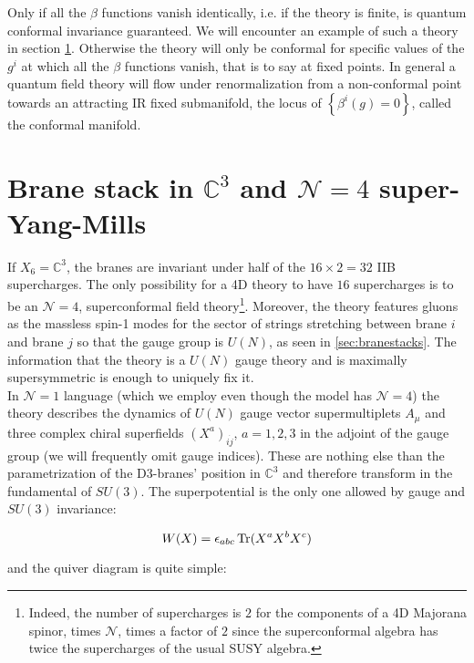 Only if all the $\beta$ functions vanish identically, i.e. if the theory is finite, is quantum conformal invariance guaranteed. We will encounter an example of such a theory in section \ref{SYM4}. Otherwise the theory will only be conformal for specific values of the $g^i$ at which all the $\beta$ functions vanish, that is to say at fixed points. In general a quantum field theory will flow under renormalization from a non-conformal point towards an attracting IR fixed submanifold, the locus of $\left\{ \beta^i(g) = 0 \right\}$, called the conformal manifold.


\section{Brane stack in $\mathbb{C}^3$ and $\mathcal{N}=4$ super-Yang-Mills} \label{SYM4}

If $X_6 = \mathbb{C}^3$, the branes are invariant under half of the $16 \times 2 = 32$ IIB supercharges. The only possibility for a 4D theory to have $16$ supercharges is to be an $\mathcal{N}=4$, superconformal field theory\footnote{Indeed, the number of supercharges is $2$ for the components of a 4D Majorana spinor, times $\mathcal{N}$, times a factor of $2$ since the superconformal algebra has twice the supercharges of the usual SUSY algebra.}. Moreover, the theory features gluons as the massless spin-1 modes for the sector of strings stretching between brane $i$ and brane $j$ so that the gauge group is $U(N)$, as seen in \ref{sec:branestacks}. The information that the theory is a $U(N)$ gauge theory and is maximally supersymmetric is enough to uniquely fix it.\\

In $\mathcal{N}=1$ language (which we employ even though the model has $\mathcal{N}=4$) the theory describes the dynamics of $U(N)$ gauge vector supermultiplets $A_\mu$ and three complex chiral superfields $(X^a)_{i\dot j}$, $a=1,2,3$ in the adjoint of the gauge group (we will frequently omit gauge indices). These are nothing else than the parametrization of the D3-branes' position in $\mathbb{C}^3$ and therefore transform in the fundamental of $SU(3)$. The superpotential is the only one allowed by gauge and $SU(3)$ invariance:

\begin{equation} W(X) = \epsilon_{abc} \operatorname{Tr} ( X^a X^b X^c) \end{equation}

and the quiver diagram is quite simple:

